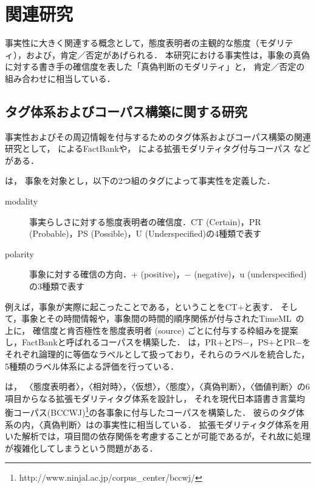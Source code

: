 \documentclass[japanese]{jnlp_1.4}
\begin{document}
\section{関連研究}
\label{sec_related}

事実性に大きく関連する概念として，態度表明者の主観的な態度（モダリティ），および，肯定／否定があげられる．
本研究における事実性は，事象の真偽に対する書き手の確信度を表した「真偽判断のモダリティ」\cite{Masuoka2007}と，
肯定／否定の組み合わせに相当している．

\subsection{タグ体系およびコーパス構築に関する研究}
\label{subsec_corpus}

事実性およびその周辺情報を付与するためのタグ体系およびコーパス構築の関連研究として，
によるFactBankや，
による拡張モダリティタグ付与コーパス
などがある．

は，
事象を対象とし，以下の2つ組のタグによって事実性を定義した．
\begin{description}
  \item[modality] 事実らしさに対する態度表明者の確信度．CT (Certain)，PR (Probable)，PS (Possible)，U (Underspecified)の4種類で表す
  \item[polarity] 事象に対する確信の方向．+ (positive)，$-$ (negative)，u (underspecified)の3種類で表す
\end{description}
例えば，事象が実際に起こったことである，ということをCT+と表す．
そして，事象とその時間情報や，事象間の時間的順序関係が付与されたTimeML~\cite{Sauri2006}の上に，
確信度と肯否極性を態度表明者 (source) ごとに付与する枠組みを提案し，FactBankと呼ばれるコーパスを構築した．
は，PR+とPS$-$，PS+とPR$-$をそれぞれ論理的に等価なラベルとして扱っており，それらのラベルを統合した，5種類のラベル体系による評価を行っている．

は，
〈態度表明者〉，〈相対時〉，〈仮想〉，〈態度〉，〈真偽判断〉，〈価値判断〉の6項目からなる拡張モダリティタグ体系を設計し，
それを現代日本語書き言葉均衡コーパス(BCCWJ)\footnote{http://www.ninjal.ac.jp/corpus\_center/bccwj/}の各事象に付与したコーパスを構築した．
彼らのタグ体系の内，〈真偽判断〉はの事実性に相当している．
拡張モダリティタグ体系を用いた解析では，項目間の依存関係を考慮することが可能であるが，それ故に処理が複雑化してしまうという問題がある．
\end{document}

